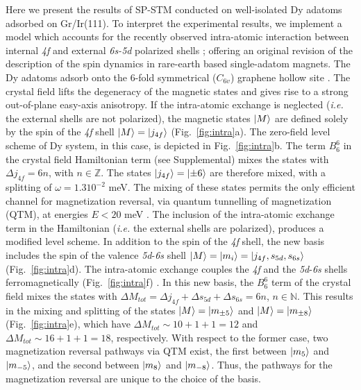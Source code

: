 \documentclass[
reprint,amsmath,amssymb,aps]{revtex4-2}
\begin{document}
Here we present the results of SP-STM conducted on well-isolated Dy adatoms adsorbed on Gr/Ir(111). To interpret the experimental results, we implement a model which accounts for the recently observed intra-atomic interaction between internal \textit{4f} and external \textit{6s-5d} polarized shells \cite{pivetta2020}; offering an original revision of the description of the spin dynamics in rare-earth based single-adatom magnets. The Dy adatoms adsorb onto the 6-fold symmetrical ($C_{6v}$) graphene hollow site \cite{baltic2018}. The crystal field lifts the degeneracy of the magnetic states and gives rise to a strong out-of-plane easy-axis anisotropy.
If the intra-atomic exchange is neglected (\textit{i.e.} the external shells are not polarized), the magnetic states $\ket{M}$ are defined solely by the spin of the \textit{4f} shell $\ket{M}=\ket{j_{4f}}$ (Fig.~\ref{fig:intra}a). The zero-field level scheme of Dy system, in this case, is depicted in Fig.~\ref{fig:intra}b. The term $B_6^6$ in the crystal field Hamiltonian term (see Supplemental) mixes the states with $\Delta j_{4f}=6n$, with $n\in \mathbb{Z}$. The states $\ket{j_{4f}}=\ket{\pm 6}$ are therefore mixed, with a splitting of $\omega=1.3 10^{-2}$ meV. The mixing of these states permits the only efficient channel for magnetization reversal, via quantum tunnelling of magnetization (QTM), at energies $E<20$ meV \citep{baltic2016}. The inclusion of the intra-atomic exchange term in the Hamiltonian (\textit{i.e.} the external shells are polarized), produces a modified level scheme. In addition to the spin of the \textit{4f} shell, the new basis includes the spin of the valence \textit{5d}-\textit{6s} shell $\ket{M}=\ket{m_i}=\ket{j_{4f},s_{5d},s_{6s}}$ (Fig.~\ref{fig:intra}d). The intra-atomic exchange couples the \textit{4f} and the \textit{5d}-\textit{6s} shells ferromagnetically (Fig.~\ref{fig:intra}f) \cite{pivetta2020}. 
In this new basis, the $B_6^6$ term of the crystal field mixes the states with $\Delta M_{tot}=\Delta j_{4f} + \Delta s_{5d} + \Delta s_{6s}=6n$, $n\in \mathbb{N}$. This results in the mixing and splitting of the states $\ket{M}=\ket{m_{\pm 5}}$ and $\ket{M}=\ket{m_{\pm 8}}$ (Fig.~\ref{fig:intra}e), which have $\Delta M_{tot}\sim 10+1+1 = 12$ and $\Delta M_{tot}\sim 16 +1+1=18$, respectively. With respect to the former case, two magnetization reversal pathways via QTM exist, the first between $\ket{m_{5}}$ and $\ket{m_{-5}}$, and the second between $\ket{m_{8}}$ and $\ket{m_{-8}}$. Thus, the pathways for the magnetization reversal are unique to the choice of the basis. 
\end{document}
